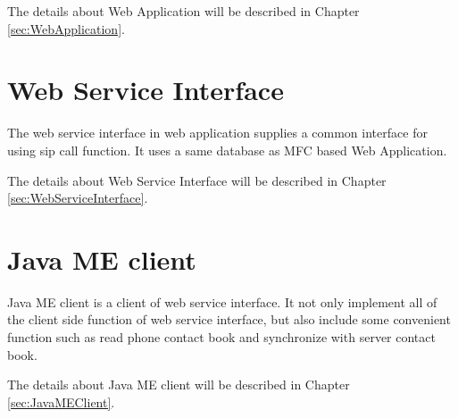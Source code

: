 The details about Web Application will be described in Chapter \ref{sec:WebApplication}.

\section{Web Service Interface}

The web service interface in web application supplies a common interface for using sip call function. It uses a same database as MFC based Web Application.

The details about Web Service Interface will be described in Chapter \ref{sec:WebServiceInterface}.

\section{Java ME client}

Java ME client is a client of web service interface. It not only implement all of the client side function of web service interface, but also include some convenient function such as read phone contact book and synchronize with server contact book.

The details about Java ME client will be described in Chapter \ref{sec:JavaMEClient}.







